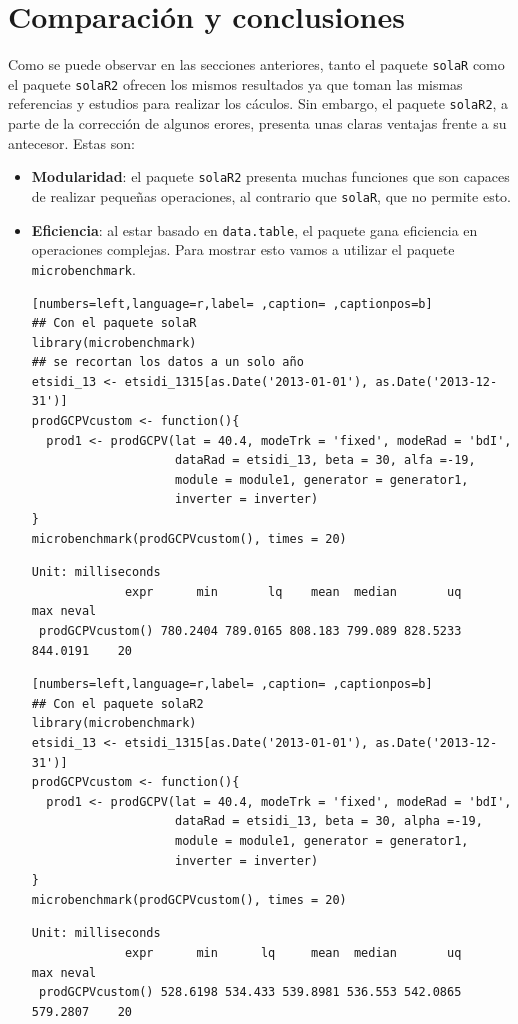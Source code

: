 \section{Comparación y conclusiones}
\label{sec:org59a9db7}
\label{sec:comparacion-conclusiones}
Como se puede observar en las secciones anteriores, tanto el paquete \texttt{solaR} como el paquete \texttt{solaR2} ofrecen los mismos resultados ya que toman las mismas referencias y estudios para realizar los cáculos. Sin embargo, el paquete \texttt{solaR2}, a parte de la corrección de algunos erores, presenta unas claras ventajas frente a su antecesor. Estas son:
\begin{itemize}
\item \textbf{Modularidad}: el paquete \texttt{solaR2} presenta muchas funciones que son capaces de realizar pequeñas operaciones, al contrario que \texttt{solaR}, que no permite esto.
\item \textbf{Eficiencia}: al estar basado en \texttt{data.table}, el paquete gana eficiencia en operaciones complejas. Para mostrar esto vamos a utilizar el paquete \texttt{microbenchmark}.
\begin{lstlisting}[numbers=left,language=r,label= ,caption= ,captionpos=b]
## Con el paquete solaR
library(microbenchmark)
## se recortan los datos a un solo año
etsidi_13 <- etsidi_1315[as.Date('2013-01-01'), as.Date('2013-12-31')]
prodGCPVcustom <- function(){  
  prod1 <- prodGCPV(lat = 40.4, modeTrk = 'fixed', modeRad = 'bdI',
                    dataRad = etsidi_13, beta = 30, alfa =-19,
                    module = module1, generator = generator1,
                    inverter = inverter)
}
microbenchmark(prodGCPVcustom(), times = 20)
\end{lstlisting}

\begin{verbatim}
Unit: milliseconds
             expr      min       lq    mean  median       uq      max neval
 prodGCPVcustom() 780.2404 789.0165 808.183 799.089 828.5233 844.0191    20
\end{verbatim}


\begin{lstlisting}[numbers=left,language=r,label= ,caption= ,captionpos=b]
## Con el paquete solaR2
library(microbenchmark)
etsidi_13 <- etsidi_1315[as.Date('2013-01-01'), as.Date('2013-12-31')]
prodGCPVcustom <- function(){  
  prod1 <- prodGCPV(lat = 40.4, modeTrk = 'fixed', modeRad = 'bdI',
                    dataRad = etsidi_13, beta = 30, alpha =-19,
                    module = module1, generator = generator1,
                    inverter = inverter)
}
microbenchmark(prodGCPVcustom(), times = 20)
\end{lstlisting}

\begin{verbatim}
Unit: milliseconds
             expr      min      lq     mean  median       uq      max neval
 prodGCPVcustom() 528.6198 534.433 539.8981 536.553 542.0865 579.2807    20
\end{verbatim}
\end{itemize}
